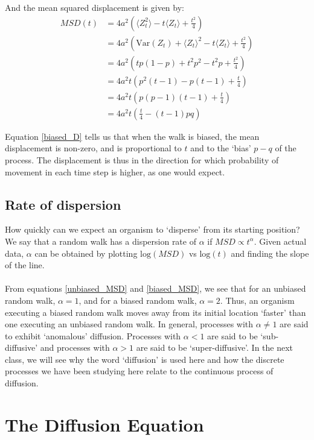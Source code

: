 And the mean squared displacement is given by:
\begin{align}
	\label{biased_MSD}
	MSD(t) &= 4a^2(\big\langle Z_{t}^2\big\rangle - t\big\langle Z_t\big\rangle + \frac{t^2}{4})\nonumber\\
	&= 4a^2\left(\textrm{Var}(Z_t) + \big\langle Z_t\big\rangle^2 - t\big\langle Z_t\big\rangle + \frac{t^2}{4}\right)\nonumber\\
	&= 4a^2\left(tp(1-p) + t^2p^2 - t^2p + \frac{t^2}{4}\right)\nonumber\\
	&= 4a^2t\left(p^2(t-1)- p(t-1) + \frac{t}{4}\right)\nonumber\\
	&= 4a^2t\left(p(p-1)(t-1)+\frac{t}{4}\right)\nonumber\\
	&= 4a^2t\left(\frac{t}{4}-(t-1)pq\right)
\end{align}

Equation \eqref{biased_D} tells us that when the walk is biased, the mean displacement is non-zero, and is proportional to $t$ and to the `bias' $p-q$ of the process. The displacement is thus in the direction for which probability of movement in each time step is higher, as one would expect.

\section{Rate of dispersion}

How quickly can we expect an organism to `disperse' from its starting position? We say that a random walk has a dispersion rate of $\alpha$ if $MSD \propto t^{\alpha} $. Given actual data, $\alpha$ can be obtained by plotting $\textrm{log}(MSD)$ vs $\textrm{log}(t)$ and finding the slope of the line.\\
\\
From equations \eqref{unbiased_MSD} and \eqref{biased_MSD}, we see that for an unbiased random walk, $\alpha = 1$, and for a biased random walk, $\alpha = 2$. Thus, an organism executing a biased random walk moves away from its initial location `faster' than one executing an unbiased random walk. In general, processes with $\alpha \neq 1$ are said to exhibit `anomalous' diffusion. Processes with $\alpha < 1$ are said to be `sub-diffusive' and processes with $\alpha > 1$ are said to be `super-diffusive'. In the next class, we will see why the word `diffusion' is used here and how the discrete processes we have been studying here relate to the continuous process of diffusion.

\chapter{The Diffusion Equation}


